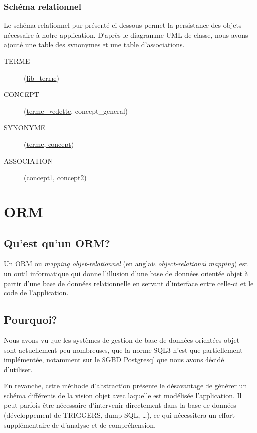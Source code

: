 \subsubsection{Schéma relationnel}

Le schéma relationnel pur présenté ci-dessous permet la persistance des objets nécessaire à notre application. D'après le diagramme UML de classe, nous avons ajouté une table des synonymes et une table d'associations.

\begin{description}
\item[TERME](\underline{lib\_terme})
\item[CONCEPT](\underline{terme\_vedette}\up{\#}, concept\_general\up{\#})
\item[SYNONYME](\underline{terme\up{\#}, concept\up{\#}})
\item[ASSOCIATION](\underline{concept1\up{\#}, concept2\up{\#}})
\end{description}

\section{ORM}

	\subsection{Qu'est qu'un ORM?}
    Un ORM ou \emph{mapping objet-relationnel} (en anglais \emph{object-relational mapping}) est un outil informatique qui donne l'illusion d'une base de données orientée objet à partir d'une base de données relationnelle en servant d'interface entre celle-ci et le code de l'application.
   
	\subsection{Pourquoi?}
    Nous avons vu que les systèmes de gestion de base de données orientées objet sont actuellement peu nombreuses, que la norme SQL3 n'est que partiellement implémentée, notamment sur le SGBD Postgresql que nous avons décidé d'utiliser.
    
En revanche, cette méthode d'abstraction présente le désavantage de générer un schéma différents de la vision objet avec laquelle est modélisée l'application. Il peut parfois être nécessaire d'intervenir directement dans la base de données (développement de TRIGGERS, dump SQL, \ldots), ce qui nécessitera un effort supplémentaire de d'analyse et de compréhension.

